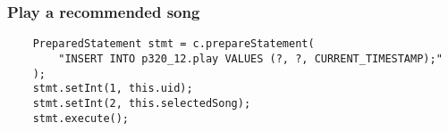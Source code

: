 \documentclass[12pt]{article}
\begin{document}
    \subsubsection{Play a recommended song}

    \begin{lstlisting}
    PreparedStatement stmt = c.prepareStatement(
        "INSERT INTO p320_12.play VALUES (?, ?, CURRENT_TIMESTAMP);"
    );
    stmt.setInt(1, this.uid);
    stmt.setInt(2, this.selectedSong);
    stmt.execute();
    \end{lstlisting}
\end{document}
